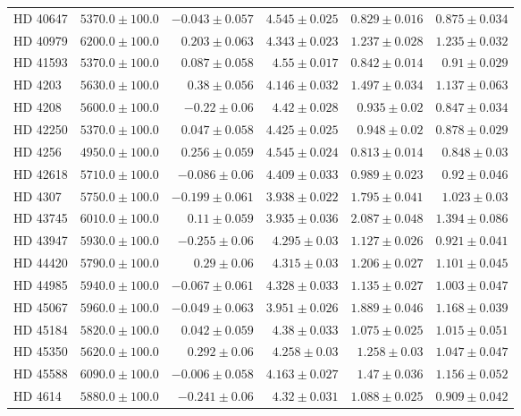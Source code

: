 \begin{longtable*}{lrrrrr}
HD 40647 & $5370.0\pm 100.0$ & $-0.043\pm 0.057$ & $4.545\pm 0.025$ & $0.829\pm 0.016$ & $0.875\pm 0.034$ \\ 
HD 40979 & $6200.0\pm 100.0$ & $0.203\pm 0.063$ & $4.343\pm 0.023$ & $1.237\pm 0.028$ & $1.235\pm 0.032$ \\ 
HD 41593 & $5370.0\pm 100.0$ & $0.087\pm 0.058$ & $4.55\pm 0.017$ & $0.842\pm 0.014$ & $0.91\pm 0.029$ \\ 
HD 4203 & $5630.0\pm 100.0$ & $0.38\pm 0.056$ & $4.146\pm 0.032$ & $1.497\pm 0.034$ & $1.137\pm 0.063$ \\ 
HD 4208 & $5600.0\pm 100.0$ & $-0.22\pm 0.06$ & $4.42\pm 0.028$ & $0.935\pm 0.02$ & $0.847\pm 0.034$ \\ 
HD 42250 & $5370.0\pm 100.0$ & $0.047\pm 0.058$ & $4.425\pm 0.025$ & $0.948\pm 0.02$ & $0.878\pm 0.029$ \\ 
HD 4256 & $4950.0\pm 100.0$ & $0.256\pm 0.059$ & $4.545\pm 0.024$ & $0.813\pm 0.014$ & $0.848\pm 0.03$ \\ 
HD 42618 & $5710.0\pm 100.0$ & $-0.086\pm 0.06$ & $4.409\pm 0.033$ & $0.989\pm 0.023$ & $0.92\pm 0.046$ \\ 
HD 4307 & $5750.0\pm 100.0$ & $-0.199\pm 0.061$ & $3.938\pm 0.022$ & $1.795\pm 0.041$ & $1.023\pm 0.03$ \\ 
HD 43745 & $6010.0\pm 100.0$ & $0.11\pm 0.059$ & $3.935\pm 0.036$ & $2.087\pm 0.048$ & $1.394\pm 0.086$ \\ 
HD 43947 & $5930.0\pm 100.0$ & $-0.255\pm 0.06$ & $4.295\pm 0.03$ & $1.127\pm 0.026$ & $0.921\pm 0.041$ \\ 
HD 44420 & $5790.0\pm 100.0$ & $0.29\pm 0.06$ & $4.315\pm 0.03$ & $1.206\pm 0.027$ & $1.101\pm 0.045$ \\ 
HD 44985 & $5940.0\pm 100.0$ & $-0.067\pm 0.061$ & $4.328\pm 0.033$ & $1.135\pm 0.027$ & $1.003\pm 0.047$ \\ 
HD 45067 & $5960.0\pm 100.0$ & $-0.049\pm 0.063$ & $3.951\pm 0.026$ & $1.889\pm 0.046$ & $1.168\pm 0.039$ \\ 
HD 45184 & $5820.0\pm 100.0$ & $0.042\pm 0.059$ & $4.38\pm 0.033$ & $1.075\pm 0.025$ & $1.015\pm 0.051$ \\ 
HD 45350 & $5620.0\pm 100.0$ & $0.292\pm 0.06$ & $4.258\pm 0.03$ & $1.258\pm 0.03$ & $1.047\pm 0.047$ \\ 
HD 45588 & $6090.0\pm 100.0$ & $-0.006\pm 0.058$ & $4.163\pm 0.027$ & $1.47\pm 0.036$ & $1.156\pm 0.052$ \\ 
HD 4614 & $5880.0\pm 100.0$ & $-0.241\pm 0.06$ & $4.32\pm 0.031$ & $1.088\pm 0.025$ & $0.909\pm 0.042$ \\ 

\end{longtable*}
